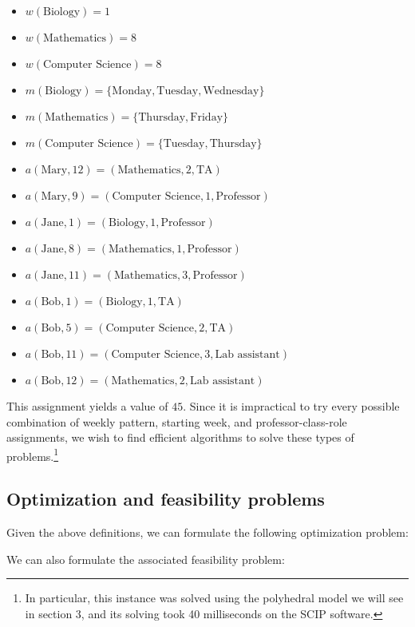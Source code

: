 \begin{itemize}
  \item $w(\text{Biology}) = 1$
  \item $w(\text{Mathematics}) = 8$
  \item $w(\text{Computer Science}) = 8$
  \item $m(\text{Biology}) = \{\text{Monday}, \text{Tuesday}, \text{Wednesday}\}$
  \item $m(\text{Mathematics}) = \{\text{Thursday}, \text{Friday}\}$
  \item $m(\text{Computer Science}) = \{\text{Tuesday}, \text{Thursday}\}$
  \item $a(\text{Mary}, 12) = (\text{Mathematics}, 2, \text{TA})$
  \item $a(\text{Mary}, 9) = (\text{Computer Science}, 1, \text{Professor})$
  \item $a(\text{Jane}, 1) = (\text{Biology}, 1, \text{Professor})$
  \item $a(\text{Jane}, 8) = (\text{Mathematics}, 1, \text{Professor})$
  \item $a(\text{Jane}, 11) = (\text{Mathematics}, 3, \text{Professor})$
  \item $a(\text{Bob}, 1) = (\text{Biology}, 1, \text{TA})$
  \item $a(\text{Bob}, 5) = (\text{Computer Science}, 2, \text{TA})$
  \item $a(\text{Bob}, 11) = (\text{Computer Science}, 3, \text{Lab assistant})$
  \item $a(\text{Bob}, 12) = (\text{Mathematics}, 2, \text{Lab assistant})$
\end{itemize}

This assignment yields a value of $45$. Since it is impractical to try every possible combination of weekly pattern, starting week, and professor-class-role assignments, we wish to find efficient algorithms to solve these types of problems.\footnote{In particular, this instance was solved using the polyhedral model we will see in section 3, and its solving took 40 milliseconds on the SCIP software.}
\newpage
\subsection{Optimization and feasibility problems}

Given the above definitions, we can formulate the following optimization problem:

We can also formulate the associated feasibility problem:
